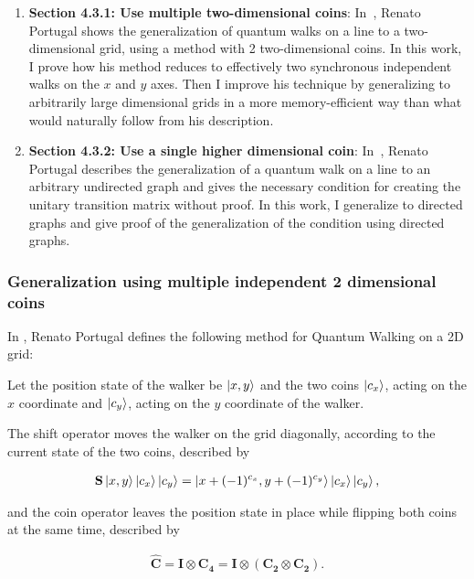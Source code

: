 \begin{enumerate}
    \item \textbf{Section 4.3.1: Use multiple two-dimensional coins}: In~\cite{Portugal}, Renato Portugal shows the generalization of quantum walks on a line to a two-dimensional grid, using a method with 2 two-dimensional coins. In this work, I prove how his method reduces to effectively two synchronous independent walks on the $x$ and $y$ axes. Then I improve his technique by generalizing to arbitrarily large dimensional grids in a more memory-efficient way than what would naturally follow from his description.
    \item \textbf{Section 4.3.2: Use a single higher dimensional coin}: In~\cite{Portugal}, Renato Portugal describes the generalization of a quantum walk on a line to an arbitrary undirected graph and gives the necessary condition for creating the unitary transition matrix without proof. In this work, I generalize to directed graphs and give proof of the generalization of the condition using directed graphs.
\end{enumerate}

\subsubsection{Generalization using multiple independent 2 dimensional coins}

In \cite{Portugal}, Renato Portugal defines the following method for Quantum Walking on a 2D grid:

Let the position state of the walker be $\ket{x,y}$ and the two coins $\ket{c_x}$, acting on the $x$ coordinate and $\ket{c_y}$, acting on the $y$ coordinate of the walker.

The shift operator moves the walker on the grid diagonally, according to the current state of the two coins, described by

\begin{align}
\label{Portugal2DShift}
    \mathbf{S}\ket{x,y}\ket{c_x}\ket{c_y} = \ket{x + (-1)^{c_x}, y + (-1)^{c_y}}\ket{c_x}\ket{c_y},
\end{align}

and the coin operator leaves the position state in place while flipping both coins at the same time, described by

\begin{align}
\mathbf{\hat{C}} = \mathbf{I} \otimes \mathbf{C_4} = \mathbf{I} \otimes (\mathbf{C_2} \otimes \mathbf{C_2}).
\end{align}

